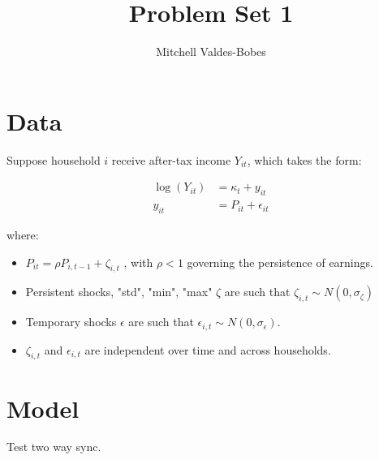 \documentclass[12pt]{article}
\begin{document}
\title{Problem Set 1 }
\author{Mitchell Valdes-Bobes}
\maketitle



\section{Data}
Suppose household $i$ receive after-tax income $Y_{i t}$, which takes the form:

\begin{align*}
    \log \left(Y_{i t}\right) &=\kappa_{t}+y_{i t} \\
    y_{i t} &=P_{i t}+\epsilon_{i t}
\end{align*}

where:
\begin{itemize}
    \item $P_{i t}=\rho P_{i, t-1}+\zeta_{i, t}$ , with $\rho<1$ governing the persistence of earnings. 
    \item Persistent shocks, "std", "min", "max" $\zeta$ are such that $\zeta_{i, t} \sim N\left(0, \sigma_{\zeta}\right)$
    \item Temporary shocks $\epsilon$ are such that  $\epsilon_{i, t} \sim N\left(0, \sigma_{\epsilon}\right)$. 
    \item $\zeta_{i, t}$ and $\epsilon_{i, t}$ are independent over time and across households.
\end{itemize}



\section{Model}
Test two way sync.


\end{document}
